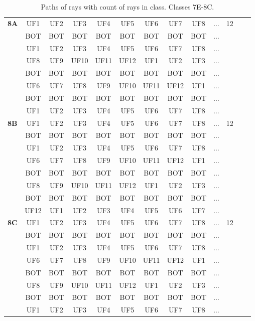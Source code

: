 \begin{table}[h!]
\begin{tabular}{|l|c|c|c|c|c|c|c|c|c|c|c|c|}
\hline \hline
\textbf{8A} & UF1 & UF2 & UF3 & UF4 & UF5 & UF6 & UF7 & UF8 & $\dots$ & 12\\
 & BOT & BOT & BOT & BOT & BOT & BOT & BOT & BOT & $\dots$ & \\
 & UF1 & UF2 & UF3 & UF4 & UF5 & UF6 & UF7 & UF8 & $\dots$ & \\
 & UF8 & UF9 & UF10 & UF11 & UF12 & UF1 & UF2 & UF3 & $\dots$ & \\
 & BOT & BOT & BOT & BOT & BOT & BOT & BOT & BOT & $\dots$ & \\
 & UF6 & UF7 & UF8 & UF9 & UF10 & UF11 & UF12 & UF1 & $\dots$ & \\
 & BOT & BOT & BOT & BOT & BOT & BOT & BOT & BOT & $\dots$ & \\
 & UF1 & UF2 & UF3 & UF4 & UF5 & UF6 & UF7 & UF8 & $\dots$ & \\
\hline \hline
\textbf{8B} & UF1 & UF2 & UF3 & UF4 & UF5 & UF6 & UF7 & UF8 & $\dots$ & 12\\
 & BOT & BOT & BOT & BOT & BOT & BOT & BOT & BOT & $\dots$ & \\
 & UF1 & UF2 & UF3 & UF4 & UF5 & UF6 & UF7 & UF8 & $\dots$ & \\
 & UF6 & UF7 & UF8 & UF9 & UF10 & UF11 & UF12 & UF1 & $\dots$ & \\
 & BOT & BOT & BOT & BOT & BOT & BOT & BOT & BOT & $\dots$ & \\
 & UF8 & UF9 & UF10 & UF11 & UF12 & UF1 & UF2 & UF3 & $\dots$ & \\
 & BOT & BOT & BOT & BOT & BOT & BOT & BOT & BOT & $\dots$ & \\
 & UF12 & UF1 & UF2 & UF3 & UF4 & UF5 & UF6 & UF7 & $\dots$ & \\
\hline \hline
\textbf{8C} & UF1 & UF2 & UF3 & UF4 & UF5 & UF6 & UF7 & UF8 & $\dots$ & 12\\
 & BOT & BOT & BOT & BOT & BOT & BOT & BOT & BOT & $\dots$ & \\
 & UF1 & UF2 & UF3 & UF4 & UF5 & UF6 & UF7 & UF8 & $\dots$ & \\
 & UF6 & UF7 & UF8 & UF9 & UF10 & UF11 & UF12 & UF1 & $\dots$ & \\
 & BOT & BOT & BOT & BOT & BOT & BOT & BOT & BOT & $\dots$ & \\
 & UF8 & UF9 & UF10 & UF11 & UF12 & UF1 & UF2 & UF3 & $\dots$ & \\
 & BOT & BOT & BOT & BOT & BOT & BOT & BOT & BOT & $\dots$ & \\
 & UF1 & UF2 & UF3 & UF4 & UF5 & UF6 & UF7 & UF8 & $\dots$ & \\
\hline 
\end{tabular}
\caption{Paths of rays with count of rays in class. Classes 7E-8C.}
\label{table:TableClasses3}
\end{table}


